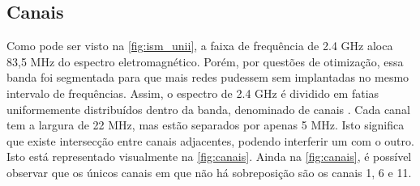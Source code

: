 \begin{figure}[H]
	\centering
\end{figure}

\subsection{Canais}
\label{subsec:canais}

Como pode ser visto na \autoref{fig:ism_unii}, a faixa de frequência de 2.4 GHz aloca 83,5 MHz do espectro eletromagnético. Porém, por questões de otimização, essa banda foi segmentada para que mais redes pudessem sem implantadas no mesmo intervalo de frequências.  Assim, o espectro de 2.4 GHz é dividido em fatias uniformemente distribuídos dentro da banda, denominado de canais \cite{flickenger2008}. Cada canal tem a largura de 22 MHz, mas estão separados por apenas 5 MHz. Isto significa que existe intersecção entre canais adjacentes, podendo interferir um com o outro. Isto está representado visualmente na \autoref{fig:canais}. Ainda na \autoref{fig:canais}, é possível observar que os únicos canais em que não há sobreposição são os canais 1, 6 e 11.

\begin{figure}[H]
	\centering
\end{figure}

